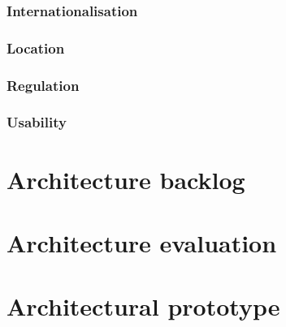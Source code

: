 \documentclass[a4paper,11pt]{report}
\begin{document}
\subsection{Internationalisation}
\label{sec:internationalisation}


\subsection{Location}
\label{sec:location}


\subsection{Regulation}
\label{sec:regulation}


\subsection{Usability}
\label{sec:usability}


\appendix

\chapter{Architecture backlog}
\label{cha:architecture-backlog}
\thispagestyle{fancy}


\chapter{Architecture evaluation}
\label{cha:arch-eval}
\thispagestyle{fancy}


\chapter{Architectural prototype}
\label{cha:arch-prot}
\thispagestyle{fancy}





%
%


\end{document}
